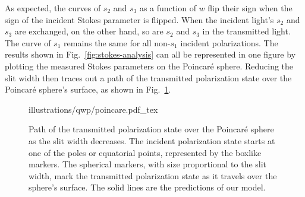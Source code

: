 As expected, the curves of $s_2$ and $s_3$ as a function of $w$ flip their sign when the sign of the incident Stokes parameter is flipped.
When the incident light's $s_2$ and $s_3$ are exchanged, on the other hand, so are $s_2$ and $s_3$ in the transmitted light.
The curve of $s_1$ remains the same for all non-$s_1$ incident polarizations.
The results shown in Fig.~\ref{fig:stokes-analysis} can all be represented in one figure by plotting the measured Stokes parameters on the Poincar\'e sphere.
Reducing the slit width then traces out a path of the transmitted polarization state over the Poincar\'e sphere's surface, as shown in Fig.~\ref{fig:poincare}.
%
\begin{figure}[tb]
\forceversofloat\centering
{illustrations/qwp/poincare.pdf_tex}
\caption{Path of the transmitted polarization state over the Poincar\'e sphere as the slit width decreases.
The incident polarization state starts at one of the poles or equatorial points, represented by the boxlike markers.
The spherical markers, with size proportional to the slit width, mark the transmitted polarization state as it travels over the sphere's surface.
The solid lines are the predictions of our model.}
\label{fig:poincare}
\end{figure}

